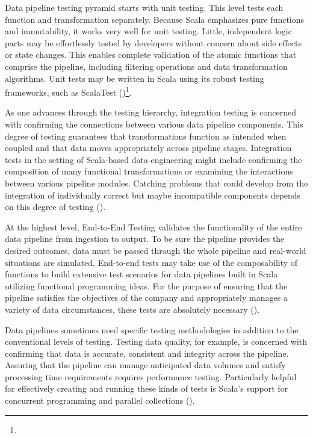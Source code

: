 Data pipeline testing pyramid starts with unit testing. This level tests each function and transformation separately. Because Scala emphasizes pure functions and immutability, it works very well for unit testing. Little, independent logic parts may be effortlessly tested by developers without concern about side effects or state changes. This enables complete validation of the atomic functions that comprise the pipeline, including filtering operations and data transformation algorithms. Unit tests may be written in Scala using its robust testing frameworks, such as ScalaTest (\cite{tests})\footnote[44]{}.

As one advances through the testing hierarchy, integration testing is concerned with confirming the connections between various data pipeline components. This degree of testing guarantees that transformations function as intended when coupled and that data moves appropriately across pipeline stages. Integration tests in the setting of Scala-based data engineering might include confirming the composition of many functional transformations or examining the interactions between various pipeline modules. Catching problems that could develop from the integration of individually correct but maybe incompatible components depends on this degree of testing (\cite{tests})\footnotemark[44].

 At the highest level, End-to-End Testing validates the functionality of the entire data pipeline from ingestion to output. To be sure the pipeline provides the desired outcomes, data must be passed through the whole pipeline and real-world situations are simulated. End-to-end tests may take use of the composability of functions to build extensive test scenarios for data pipelines built in Scala utilizing functional programming ideas. For the purpose of ensuring that the pipeline satisfies the objectives of the company and appropriately manages a variety of data circumstances, these tests are absolutely necessary (\cite{tests})\footnotemark[44].

Data pipelines sometimes need specific testing methodologies in addition to the conventional levels of testing. Testing data quality, for example, is concerned with confirming that data is accurate, consistent and integrity across the pipeline. Assuring that the pipeline can manage anticipated data volumes and satisfy processing time requirements requires performance testing. Particularly helpful for effectively creating and running these kinds of tests is Scala's support for concurrent programming and parallel collections (\cite{tests})\footnotemark[44].


